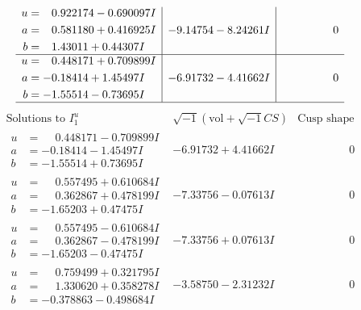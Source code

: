 \documentclass[1p]{elsarticle_modified}
\theoremstyle{definition}
\newcommand{\I}{\sqrt{-1}}
\begin{document}
$$\begin{array}{c|c|c}
\begin{aligned}
u &= \phantom{-}0.922174 - 0.690097 I \\
a &= \phantom{-}0.581180 + 0.416925 I \\
b &= \phantom{-}1.43011 + 0.44307 I\end{aligned}
 & -9.14754 - 8.24261 I & \phantom{-0.000000 } 0 \\ \hline\begin{aligned}
u &= \phantom{-}0.448171 + 0.709899 I \\
a &= -0.18414 + 1.45497 I \\
b &= -1.55514 - 0.73695 I\end{aligned}
 & -6.91732 - 4.41662 I & \phantom{-0.000000 } 0\\
 \hline 
 \end{array}$$\newpage$$\begin{array}{c|c|c}  
\text{Solutions to }I^u_{1}& \I (\text{vol} + \sqrt{-1}CS) & \text{Cusp shape}\\
 \hline 
\begin{aligned}
u &= \phantom{-}0.448171 - 0.709899 I \\
a &= -0.18414 - 1.45497 I \\
b &= -1.55514 + 0.73695 I\end{aligned}
 & -6.91732 + 4.41662 I & \phantom{-0.000000 } 0 \\ \hline\begin{aligned}
u &= \phantom{-}0.557495 + 0.610684 I \\
a &= \phantom{-}0.362867 + 0.478199 I \\
b &= -1.65203 + 0.47475 I\end{aligned}
 & -7.33756 - 0.07613 I & \phantom{-0.000000 } 0 \\ \hline\begin{aligned}
u &= \phantom{-}0.557495 - 0.610684 I \\
a &= \phantom{-}0.362867 - 0.478199 I \\
b &= -1.65203 - 0.47475 I\end{aligned}
 & -7.33756 + 0.07613 I & \phantom{-0.000000 } 0 \\ \hline\begin{aligned}
u &= \phantom{-}0.759499 + 0.321795 I \\
a &= \phantom{-}1.330620 + 0.358278 I \\
b &= -0.378863 - 0.498684 I\end{aligned}
 & -3.58750 - 2.31232 I & \phantom{-0.000000 } 0 \\ \hline\begin{aligned}

\end{aligned}
\end{array}$$
\end{document}
